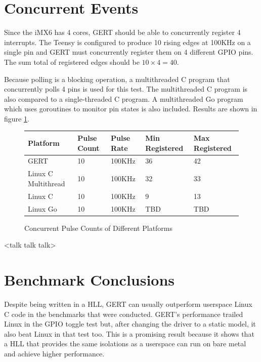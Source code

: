 \section{Concurrent Events}\label{sec:concurrency}
Since the iMX6 has 4 cores, GERT should be able to concurrently
register 4 interrupts. The Teensy is configured to produce 10 rising edges
at 100KHz on a single pin and GERT must concurrently register them on 4 different
GPIO pins. The sum total of registered edges should be $10\times4=40$.

Because polling is a blocking operation, a multithreaded C program that concurrently
polls 4 pins is used for this test. The multithreaded C program is also compared
to a single-threaded C program. A multithreaded Go program which uses goroutines
to monitor pin states is also included.
Results are shown in figure \ref{fig:ccounter}.

\begin{figure} [h]
\begin{center}
  \begin{tabular}{ | l | l | l | l | l |}
    \hline
    Platform & Pulse Count & Pulse Rate & Min Registered & Max Registered \\ \hline
    GERT & 10 & 100KHz & 36 & 42 \\ \hline
    Linux C Multithread & 10 & 100KHz & 32 & 33 \\ \hline
    Linux C & 10 & 100KHz & 9 & 13 \\ \hline
    Linux Go & 10 & 100KHz & TBD & TBD \\
    \hline
  \end{tabular}
\end{center}
  \caption{Concurrent Pulse Counts of Different Platforms}  \label{fig:ccounter}
\end{figure}


<talk talk talk>

\section{Benchmark Conclusions}

Despite being written in a HLL, GERT can usually outperform userspace
Linux C code in the benchmarks that were conducted. GERT's performance trailed
Linux in the GPIO toggle test but, after changing the driver to a static model,
it also beat Linux in that test too. This is a promising result because it shows
that a HLL that provides the same isolations as a userspace can run on bare metal
and achieve higher performance.

